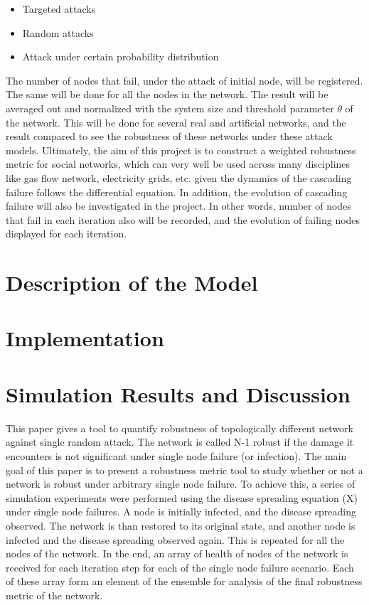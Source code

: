 \documentclass[11pt]{article}
\begin{document}
\begin{itemize}
\item Targeted attacks
\item Random attacks
\item Attack under certain probability distribution
\end{itemize}

 The number of nodes that fail, under the attack of initial node, will be registered. The same will be done for all the nodes in the network. The result will be averaged out and normalized with the system size and threshold parameter $\theta$ of the network. This will be done for several real and artificial networks, and the result compared to see the robustness of these networks under these attack models. Ultimately, the aim of this project is to construct a weighted robustness metric for social networks, which can very well be used across many disciplines like gas flow network, electricity grids, etc. given the dynamics of the cascading failure follows the differential equation. In addition, the evolution of cascading failure will also be investigated in the project. In other words, number of nodes that fail in each iteration also will be recorded, and the evolution of failing nodes displayed for each iteration.

\section{Description of the Model}

\section{Implementation}

\newpage
\section{Simulation Results and Discussion}
This paper gives a tool to quantify robustness of topologically different network against single random attack. The network is called N-1 robust if the damage it encounters is not significant under single node failure (or infection). The main goal of this paper is to present a robustness metric tool to study whether or not a network is robust under arbitrary single node failure. To achieve this, a series of simulation experiments were performed using the disease spreading equation (X) under single node failures. A node is initially infected, and the disease spreading observed. The network is than restored to its original state, and another node is infected and the disease spreading observed again. This is repeated for all the nodes of the network. In the end, an array of health of nodes of the network is received for each iteration step for each of the single node failure scenario. Each of these array form an element of the ensemble for analysis of the final robustness metric of the network. 
\end{document}
